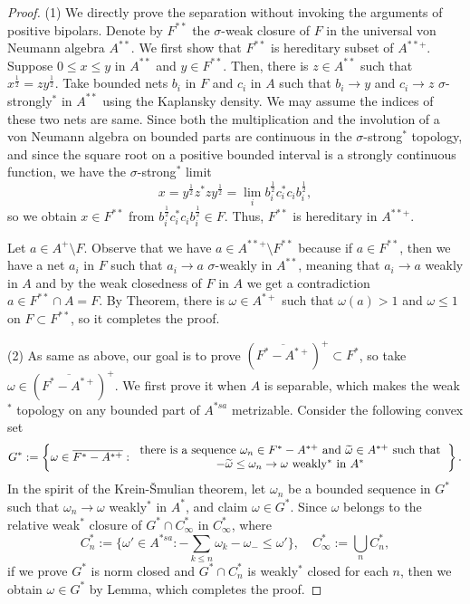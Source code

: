 \documentclass[a4paper]{amsart}
\theoremstyle{plain}
\theoremstyle{definition}
\begin{document}
\begin{proof}
(1)
We directly prove the separation without invoking the arguments of positive bipolars.
Denote by $F^{**}$ the $\sigma$-weak closure of $F$ in the universal von Neumann algebra $A^{**}$.
We first show that $F^{**}$ is hereditary subset of $A^{**+}$.
Suppose $0\le x\le y$ in $A^{**}$ and $y\in F^{**}$.
Then, there is $z\in A^{**}$ such that $x^{\frac12}=zy^{\frac12}$.
Take bounded nets $b_i$ in $F$ and $c_i$ in $A$ such that $b_i\to y$ and $c_i\to z$ $\sigma$-strongly$^*$ in $A^{**}$ using the Kaplansky density.
We may assume the indices of these two nets are same.
Since both the multiplication and the involution of a von Neumann algebra on bounded parts are continuous in the $\sigma$-strong$^*$ topology, and since the square root on a positive bounded interval is a strongly continuous function, we have the $\sigma$-strong$^*$ limit
\[x=y^{\frac12}z^*zy^{\frac12}=\lim_ib_i^{\frac12}c_i^*c_ib_i^{\frac12},\]
so we obtain $x\in F^{**}$ from $b_i^{\frac12}c_i^*c_ib_i^{\frac12}\in F$.
Thus, $F^{**}$ is hereditary in $A^{**+}$.

Let $a\in A^+\setminus F$.
Observe that we have $a\in A^{**+}\setminus F^{**}$ because if $a\in F^{**}$, then we have a net $a_i$ in $F$ such that $a_i\to a$ $\sigma$-weakly in $A^{**}$, meaning that $a_i\to a$ weakly in $A$ and by the weak closedness of $F$ in $A$ we get a contradiction $a\in F^{**}\cap A=F$.
By Theorem, there is $\omega\in A^{*+}$ such that $\omega(a)>1$ and $\omega\le1$ on $F\subset F^{**}$, so it completes the proof.

(2)
As same as above, our goal is to prove $(\overline{F^*-A^{*+}})^+\subset F^*$, so take $\omega\in(\overline{F^*-A^{*+}})^+$.
We first prove it when $A$ is separable, which makes the weak$^*$ topology on any bounded part of $A^{*sa}$ metrizable.
Consider the following convex set
\[G^*:=\left\{\omega\in\overline{F^*-A^{*+}}:\begin{tabular}{c}there is a sequence $\omega_n\in F^*-A^{*+}$ and $\widetilde\omega\in A^{*+}$ such that\\$-\widetilde\omega\le\omega_n\to\omega$ weakly$^*$ in $A^*$\end{tabular}\right\}.\]
In the spirit of the Krein-\v Smulian theorem, let $\omega_n$ be a bounded sequence in $G^*$ such that $\omega_n\to\omega$ weakly$^*$ in $A^*$, and claim $\omega\in G^*$.
Since $\omega$ belongs to the relative weak$^*$ closure of $G^*\cap C_\infty^*$ in $C_\infty^*$, where
\[C_n^*:=\{\omega'\in A^{*sa}:-\sum_{k\le n}\omega_k-\omega_-\le\omega'\},\quad C_\infty^*:=\bigcup_nC_n^*,\]
if we prove $G^*$ is norm closed and $G^*\cap C_n^*$ is weakly$^*$ closed for each $n$, then we obtain $\omega\in G^*$ by Lemma, which completes the proof.


\end{proof}
\end{document}
